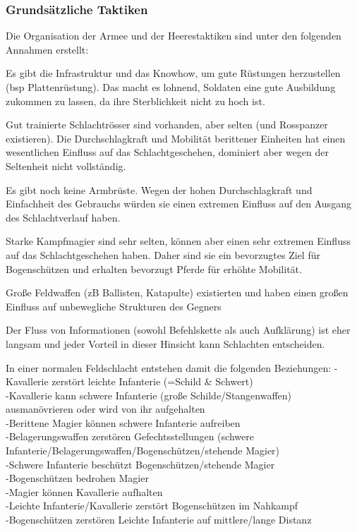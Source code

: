 \subsubsection{Grundsätzliche Taktiken}
Die Organisation der Armee und der Heerestaktiken sind unter den folgenden Annahmen erstellt:
\begin{outline}
	\item Es gibt die Infrastruktur und das Knowhow, um gute Rüstungen herzustellen (bsp Plattenrüstung). 
		Das macht es lohnend, Soldaten eine gute Ausbildung zukommen zu lassen, da ihre Sterblichkeit nicht zu hoch ist.
	\item Gut trainierte Schlachtrösser sind vorhanden, aber selten (und Rosspanzer existieren). 
		Die Durchschlagkraft und Mobilität berittener Einheiten hat einen wesentlichen Einfluss auf das Schlachtgeschehen, dominiert aber wegen der Seltenheit nicht vollständig.
	\item Es gibt noch keine Armbrüste. Wegen der hohen Durchschlagkraft und Einfachheit des Gebrauchs würden sie einen extremen Einfluss auf den Ausgang des Schlachtverlauf haben.
	\item Starke Kampfmagier sind sehr selten, können aber einen sehr extremen Einfluss auf das Schlachtgeschehen haben. 
		Daher sind sie ein bevorzugtes Ziel für Bogenschützen und erhalten bevorzugt Pferde für erhöhte Mobilität.
	\item Große Feldwaffen (zB Ballisten, Katapulte) existierten und haben einen großen Einfluss auf unbewegliche Strukturen des Gegners
	\item Der Fluss von Informationen (sowohl Befehlskette als auch Aufklärung) ist eher langsam und jeder Vorteil in dieser Hinsicht kann Schlachten entscheiden.
\end{outline}
In einer normalen Feldschlacht entstehen damit die folgenden Beziehungen:
-Kavallerie zerstört leichte Infanterie (=Schild & Schwert)\\
-Kavallerie kann schwere Infanterie (große Schilde/Stangenwaffen) ausmanövrieren oder wird von ihr aufgehalten\\
-Berittene Magier können schwere Infanterie aufreiben\\
-Belagerungswaffen zerstören Gefechtsstellungen (schwere Infanterie/Belagerungswaffen/Bogenschützen/stehende Magier)\\
-Schwere Infanterie beschützt Bogenschützen/stehende Magier\\
-Bogenschützen bedrohen Magier\\
-Magier können Kavallerie aufhalten\\
-Leichte Infanterie/Kavallerie zerstört Bogenschützen im Nahkampf\\
-Bogenschützen zerstören Leichte Infanterie auf mittlere/lange Distanz 

